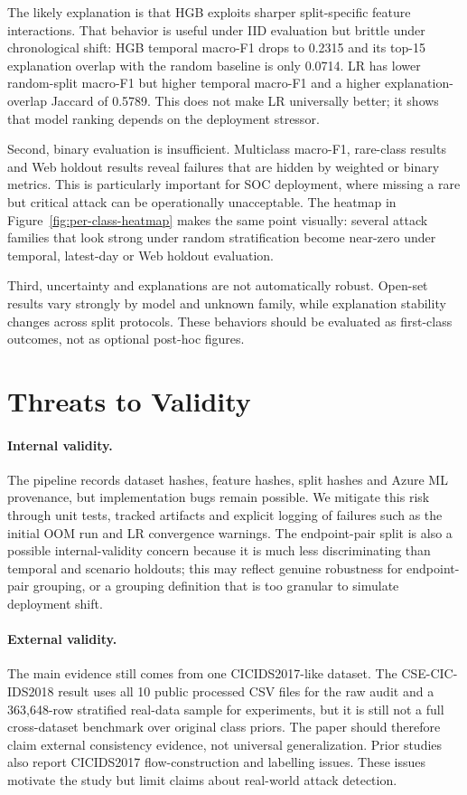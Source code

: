 \documentclass[11pt,a4paper]{article}
\begin{document}
The likely explanation is that HGB exploits sharper split-specific feature interactions. That behavior is useful under IID evaluation but brittle under chronological shift: HGB temporal macro-F1 drops to 0.2315 and its top-15 explanation overlap with the random baseline is only 0.0714. LR has lower random-split macro-F1 but higher temporal macro-F1 and a higher explanation-overlap Jaccard of 0.5789. This does not make LR universally better; it shows that model ranking depends on the deployment stressor.

Second, binary evaluation is insufficient. Multiclass macro-F1, rare-class results and Web holdout results reveal failures that are hidden by weighted or binary metrics. This is particularly important for SOC deployment, where missing a rare but critical attack can be operationally unacceptable. The heatmap in Figure~\ref{fig:per-class-heatmap} makes the same point visually: several attack families that look strong under random stratification become near-zero under temporal, latest-day or Web holdout evaluation.

Third, uncertainty and explanations are not automatically robust. Open-set results vary strongly by model and unknown family, while explanation stability changes across split protocols. These behaviors should be evaluated as first-class outcomes, not as optional post-hoc figures.

\section{Threats to Validity}

\paragraph{Internal validity.}
The pipeline records dataset hashes, feature hashes, split hashes and Azure ML provenance, but implementation bugs remain possible. We mitigate this risk through unit tests, tracked artifacts and explicit logging of failures such as the initial OOM run and LR convergence warnings. The endpoint-pair split is also a possible internal-validity concern because it is much less discriminating than temporal and scenario holdouts; this may reflect genuine robustness for endpoint-pair grouping, or a grouping definition that is too granular to simulate deployment shift.

\paragraph{External validity.}
The main evidence still comes from one CICIDS2017-like dataset. The CSE-CIC-IDS2018 result uses all 10 public processed CSV files for the raw audit and a 363,648-row stratified real-data sample for experiments, but it is still not a full cross-dataset benchmark over original class priors. The paper should therefore claim external consistency evidence, not universal generalization. Prior studies also report CICIDS2017 flow-construction and labelling issues. These issues motivate the study but limit claims about real-world attack detection.
\end{document}
